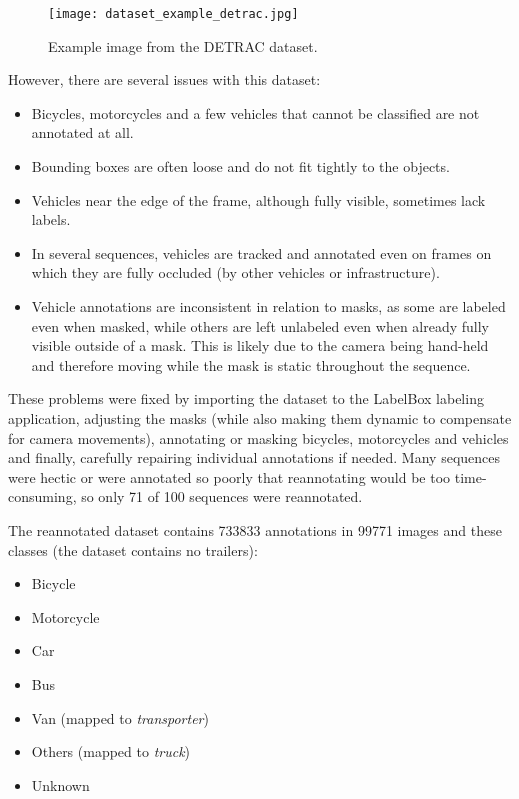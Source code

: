 \begin{figure}[h]
    \centering
    \texttt{[image: dataset\_example\_detrac.jpg]}
    \caption{Example image from the DETRAC dataset.}
    \label{DetracDatasetExample}
\end{figure}

However, there are several issues with this dataset:
\begin{itemize}
    \item Bicycles, motorcycles and a few vehicles that cannot be classified are
    not annotated at all.
    \item Bounding boxes are often loose and do not fit tightly to the objects.
    \item Vehicles near the edge of the frame, although fully visible, sometimes
    lack labels.
    \item In several sequences, vehicles are tracked and annotated even on
    frames on which they are fully occluded (by other vehicles or
    infrastructure).
    \item Vehicle annotations are inconsistent in relation to masks, as some are
    labeled even when masked, while others are left unlabeled even when already
    fully visible outside of a mask. This is likely due to the camera being
    hand-held and therefore moving while the mask is static throughout the
    sequence.
\end{itemize}

These problems were fixed by importing the dataset to the LabelBox labeling
application, adjusting the masks (while also making them dynamic to compensate
for camera movements), annotating or masking bicycles, motorcycles and
 vehicles and finally, carefully repairing individual annotations if
needed. Many sequences were hectic or were annotated so poorly that reannotating
would be too time-consuming, so only 71 of 100 sequences were reannotated.

The reannotated dataset contains \num{733833} annotations in \num{99771}
images and these classes (the dataset contains no trailers):
\begin{itemize}
    \item Bicycle
    \item Motorcycle
    \item Car
    \item Bus
    \item Van (mapped to \textit{transporter})
    \item Others (mapped to \textit{truck})
    \item Unknown
\end{itemize}


